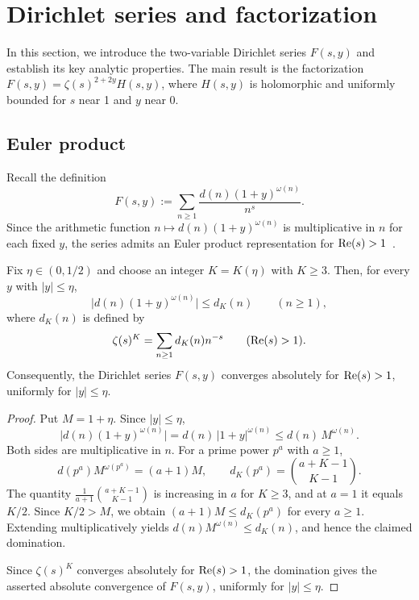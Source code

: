 \section{Dirichlet series and factorization}\label{sec:dirichlet-series}

In this section, we introduce the two-variable Dirichlet series
$F(s, y)$ and establish its key analytic properties. The main
result is the factorization
$F(s, y) = \zeta(s)^{2+2y} H(s, y)$, where $H(s, y)$ is holomorphic
and uniformly bounded for $s$ near 1 and $y$ near 0.

\subsection{Euler product}\label{sec:euler-product}

Recall the definition
\begin{equation}
    F(s, y) := \sum_{n \geq 1} \frac{d(n)(1+y)^{\omega(n)}}{n^s}.
\end{equation}
Since the arithmetic function $n \mapsto d(n)(1+y)^{\omega(n)}$ is
multiplicative in $n$ for each fixed $y$, the series admits an Euler
product representation for $\operatorname{Re}(s) > 1$~\cite{Apostol1976}.

\begin{lemma}\label{lem:euler-product-conv}
Fix $\eta\in(0,1/2)$ and choose an integer $K=K(\eta)$ with
$K\geq3$. Then, for every $y$ with $|y|\leq\eta$,
\[
    \bigl|d(n)(1+y)^{\omega(n)}\bigr|\leq d_K(n)
    \qquad(n\geq1),
\]
where $d_K(n)$ is defined by
\[
    \zeta(s)^K=\sum_{n\geq1}d_K(n)n^{-s}
    \qquad (\operatorname{Re}(s)>1).
\]
Consequently, the Dirichlet series $F(s,y)$
converges absolutely for $\operatorname{Re}(s)>1$, uniformly for $|y|\leq\eta$.
\end{lemma}

\begin{proof}
Put $M=1+\eta$. Since $|y|\leq\eta$,
\[
    \bigl|d(n)(1+y)^{\omega(n)}\bigr|
        = d(n)\,|1+y|^{\omega(n)}
        \leq d(n)\,M^{\omega(n)}.
\]
Both sides are multiplicative in $n$. For a prime power $p^a$ with $a\geq1$,
\[
    d(p^a)M^{\omega(p^a)}=(a+1)M,
    \qquad
    d_K(p^a)=\binom{a+K-1}{K-1}.
\]
The quantity $\frac{1}{a+1}\binom{a+K-1}{K-1}$ is increasing in $a$
for $K\geq3$, and at $a=1$ it equals $K/2$. Since $K/2>M$, we obtain $(a+1)M\leq d_K(p^a)$ for every
$a\geq1$. Extending multiplicatively yields
$d(n)M^{\omega(n)}\leq d_K(n)$, and hence the claimed domination.

Since $\zeta(s)^K$ converges absolutely for $\operatorname{Re}(s)>1$, the
domination gives the asserted absolute convergence of $F(s,y)$,
uniformly for $|y|\leq\eta$.
\end{proof}


